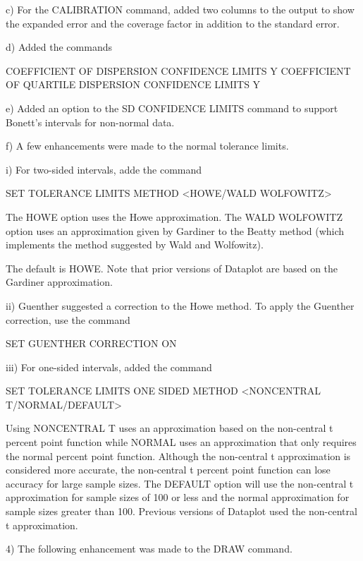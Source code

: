     c) For the CALIBRATION command, added two columns to the output to
       show the expanded error and the coverage factor in addition to
       the standard error.

    d) Added the commands

           COEFFICIENT OF DISPERSION CONFIDENCE LIMITS Y
           COEFFICIENT OF QUARTILE DISPERSION CONFIDENCE LIMITS Y

    e) Added an option to the SD CONFIDENCE LIMITS command to
       support Bonett's intervals for non-normal data.

    f) A few enhancements were made to the normal tolerance limits.

          i) For two-sided intervals, adde the command

                SET TOLERANCE LIMITS METHOD <HOWE/WALD WOLFOWITZ>

             The HOWE option uses the Howe approximation.  The
             WALD WOLFOWITZ option uses an approximation given
             by Gardiner to the Beatty method (which implements
             the method suggested by Wald and Wolfowitz).

             The default is HOWE.  Note that prior versions of
             Dataplot are based on the Gardiner approximation.

         ii) Guenther suggested a correction to the Howe method.
             To apply the Guenther correction, use the command

                SET GUENTHER CORRECTION ON

        iii) For one-sided intervals, added the command

                SET TOLERANCE LIMITS ONE SIDED METHOD
                    <NONCENTRAL T/NORMAL/DEFAULT>

             Using NONCENTRAL T uses an approximation based on the
             non-central t percent point function while NORMAL uses an
             approximation that only requires the normal percent point
             function.  Although the non-central t approximation is
             considered more accurate, the non-central t percent point
             function can lose accuracy for large sample sizes.  The
             DEFAULT option will use the non-central t approximation
             for sample sizes of 100 or less and the normal approximation
             for sample sizes greater than 100.  Previous versions of
             Dataplot used the non-central t approximation.

 4) The following enhancement was made to the DRAW command.

